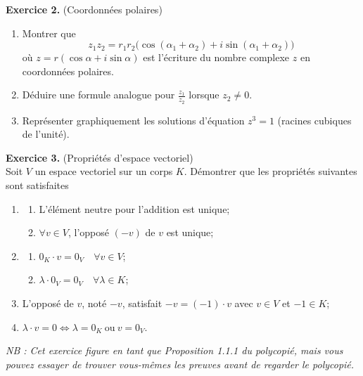 \documentclass[a4paper, 10pt]{report}
\begin{document}
	\vspace{5mm}
	\noindent
	\textbf{Exercice 2.} (Coordonnées polaires)
	
	\begin{enumerate}[label=(\alph*)]
		\item Montrer que
		\[
			z_1z_2 = r_1r_2\big(\cos(\alpha_1 + \alpha_2)
				+ i\sin(\alpha_1 + \alpha_2)\big)
		\]
		où $z = r(\cos\alpha + i \sin\alpha)$ est l'écriture du
		nombre complexe $z$ en coordonnées polaires.
		\item Déduire une formule analogue pour $\frac{z_1}{z_2}$
		lorsque $z_2 \neq 0$.
		\item Représenter graphiquement les solutions d'équation
		$z^3 = 1$ (racines cubiques de l'unité).
	\end{enumerate}
	
	\vspace{5mm}
	\noindent
	\textbf{Exercice 3.} (Propriétés d'espace vectoriel)\\
	Soit $V$ un espace vectoriel sur un corps $K$. Démontrer que les
	propriétés suivantes sont satisfaites
	
	\begin{enumerate}[label=\arabic*.]
		\item \begin{enumerate}[label=(\alph*)]
			\item L'élément neutre pour l'addition est unique;
			\item $\forall v \in V$, l'opposé $(-v)$ de $v$ est unique;
		\end{enumerate}
		\item \begin{enumerate}[label=(\alph*)]
			\item $0_K \cdot v = 0_V \quad \forall v \in V$;
			\item $\lambda \cdot 0_V = 0_V \quad \forall \lambda \in K$;
		\end{enumerate}
		\item L'opposé de $v$, noté $-v$, satisfait $-v = (-1) \cdot v$
		avec $v \in V$ et $-1 \in K$;
		\item $\lambda \cdot v = 0 \iff
			\lambda = 0_K \ \text{ou}\ v = 0_V$.
	\end{enumerate}
		
	\noindent
	\textit{NB : Cet exercice figure en tant que Proposition 1.1.1 du
		polycopié, mais vous pouvez essayer de trouver vous-mêmes
		les preuves avant de regarder le polycopié.}
	
\end{document}
